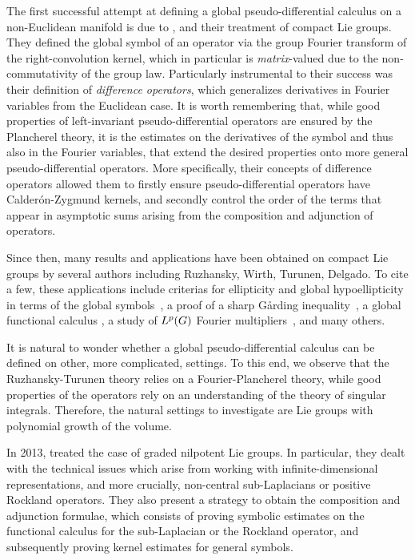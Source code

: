 The first successful attempt at defining a global pseudo-differential calculus
on a non-Euclidean manifold is due to \citeauthor{RuzhanskyTurunen10},
and their treatment of compact Lie groups.
They defined the global symbol of an operator via the group Fourier transform of the right-convolution kernel,
which in particular is  \emph{matrix}-valued
due to the non-commutativity of the group law.
Particularly instrumental to their success was their definition of \emph{difference operators},
which generalizes derivatives in Fourier variables from the Euclidean case.
It is worth remembering that,
while good properties of left-invariant pseudo-differential operators
are ensured by the Plancherel theory,
it is the estimates on the derivatives of the symbol and thus also in the Fourier variables,
that extend the desired properties onto more general pseudo-differential operators.
More specifically,
their concepts of difference operators allowed them to firstly ensure pseudo-differential operators
have Calder\'on-Zygmund kernels,
and secondly control the order of the terms that appear in asymptotic sums
arising from the composition and adjunction of operators.

Since then,
many results and applications have been obtained on compact Lie groups
by several authors including Ruzhansky, Wirth, Turunen, Delgado.
To cite a few,
these applications include
criterias for ellipticity and global hypoellipticity in terms of the global symbols~\cite{RuzhanskyTurunen10},
a proof of a sharp Gårding inequality~\cite{RuzhanskyTurunen11},
a global functional calculus \cite{RuzhanskyWirth14},
a study of ${L^{p} (G)}$ Fourier multipliers~\cite{RuzhanskyWirth15},
and many others.

It is natural to wonder whether a global pseudo-differential calculus can be defined on other,
more complicated, settings.
To this end,
we observe that the Ruzhansky-Turunen theory relies on a Fourier-Plancherel theory,
while good properties of the operators rely on an understanding of the theory of singular integrals.
Therefore,
the natural settings to investigate are Lie groups with polynomial growth of the volume.

In 2013,
\citeauthor{FischerRuzhansky12} treated the case of graded nilpotent Lie groups.
In particular,
they dealt with the technical issues which arise from working with infinite-dimensional representations,
and more crucially,
non-central sub-Laplacians or positive Rockland operators.
They also present a strategy to obtain the composition and adjunction formulae,
which consists of proving symbolic estimates on the functional calculus for the sub-Laplacian or the Rockland operator,
and subsequently proving kernel estimates for general symbols.

